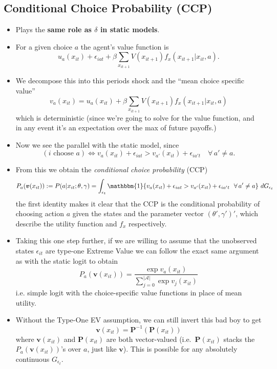 \documentclass[11pt]{article}
\begin{document}
\subsection*{Conditional Choice Probability (CCP)}
	\begin{itemize}
		\item Plays the \textbf{same role as $\delta$ in static models}.
		\item For a given choice $a$ the agent's value function is
		\begin{equation}
			u_a(x_{it}) + \epsilon_{iat} + \beta \sum_{x_{it+1}}V(x_{it+1})f_x(x_{it+1}|x_{it}, a).
		\end{equation}
		\item We decompose this into this periods shock and the ``mean choice specific value''
		\begin{equation}
		v_a(x_{it})=u_a(x_{it}) + \beta \sum_{x_{it+1}}V(x_{it+1})f_x(x_{it+1}|x_{it}, a)
		\end{equation}
		which is deterministic (since we're going to solve for the value function, and in any event it's an expectation over the max of future payoffs.)
		\item Now we see the parallel with the static model, since
		\begin{equation}
			(i \text{ choose } a) \iff v_a(x_{it}) + \epsilon_{iat} >  v_{a'}(x_{it}) + \epsilon_{ia't} \quad \forall\, a'\neq a.
		\end{equation}
		\item From this we obtain the \textit{conditional choice probability} (CCP)
		\begin{equation}
			P_a(\bm{v}(x_{it})) :=P(a|x_{it}; \theta, \gamma)= \int_{\epsilon_{t}} \mathbbm{1}\{v_a(x_{it}) + \epsilon_{iat} > v_{a'}(x_{it}) + \epsilon_{ia't}~~ \forall\, a'\neq a\} ~dG_{\epsilon_{t}}
		\end{equation}
		the first identity makes it clear that the CCP is the conditional probability of choosing action $a$ given the states and the parameter vector $(\theta', \gamma')'$, which describe the utility function and $f_x$ respectively.
		\item Taking this one step further, if we are willing to assume that the unobserved states $\epsilon_{it}$ are type-one Extreme Value we can follow the exact same argument as with the static logit to obtain
		\begin{equation}
		P_a(\bm{v}(x_{it})) = \frac{\exp{v_a(x_{it})}}{\sum_{j=0}^{|\mathcal{A}|}\exp{v_j(x_{it})}}
		\end{equation}
		i.e. simple logit with the choice-specific value functions in place of mean utility.
		\item Without the Type-One EV assumption, we can still invert this bad boy to get
		\begin{equation}
		\bm{v}(x_{it}) = \bm{P}^{-1}(\bm{P}(x_{it}))
		\end{equation}
		where $\bm{v}(x_{it})$ and $\bm{P}(x_{it})$ are both vector-valued (i.e.\ $\bm{P}(x_{it})$ stacks the $P_a(\bm{v}(x_{it}))$'s over $a$, just like $\bm{v}$). This is possible for any absolutely continuous $G_{\epsilon_{t}}$.
	\end{itemize}
\end{document}

